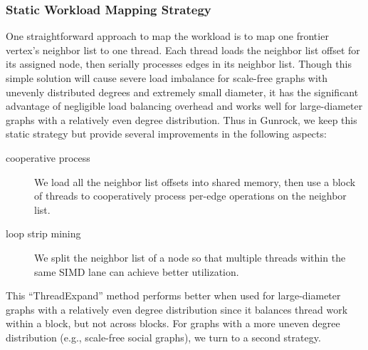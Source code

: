 \documentclass[format=acmsmall,review=false,screen=true]{acmart}
\begin{document}
\subsubsection{Static Workload Mapping Strategy}
One straightforward approach to map the workload is to map one
frontier vertex's neighbor list to one thread. Each thread loads the
neighbor list offset for its assigned node, then serially processes
edges in its neighbor list. Though this simple solution will cause
severe load imbalance for scale-free graphs with unevenly distributed
degrees and extremely small diameter, it has the significant advantage
of negligible load balancing overhead and works well for
large-diameter graphs with a relatively even degree distribution. Thus
in Gunrock, we keep this static strategy but provide several
improvements in the following aspects:
\begin{description}
\item[cooperative process] We load all the neighbor list offsets into
  shared memory, then use a block of threads to cooperatively process
  per-edge operations on the neighbor list.
\item[loop strip mining] We split the neighbor list of a node so that
  multiple threads within the same SIMD lane can achieve better
  utilization.
\end{description}
This ``ThreadExpand'' method performs better when used for
large-diameter graphs with a relatively even degree distribution since
it balances thread work within a block, but not across blocks. For
graphs with a more uneven degree distribution (e.g., scale-free social
graphs), we turn to a second strategy.
\end{document}
